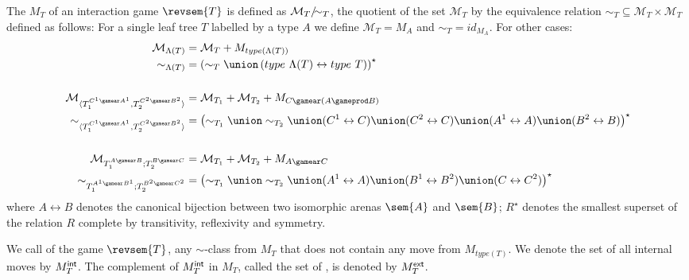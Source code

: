 \begin{definition}
The  $M_T$ of an interaction game
$\revsem{T}$ is defined as $\mathcal{M}_T/\hspace{-0.5em}\sim_T$,
the quotient of the set $\mathcal{M}_T$ by the equivalence relation
$\sim_T \subseteq \mathcal{M}_T \times \mathcal{M}_T$ defined as follows:
For a single leaf tree $T$ labelled by a type $A$ we define
$\mathcal{M}_T = M_A$ and $\sim_T = id_{M_A}$. For other cases:
    \begin{align*}
        \mathcal{M}_{\Lambda(T)} &= \mathcal{M}_{T} + M_{type(\Lambda(T))}
    \\
        \sim_{\Lambda(T)} &= \left( \sim_{T}
        \union \left(type\ \Lambda(T) \leftrightarrow type\ T\right)
        \right)^\star
    \\
    \\
        \mathcal{M}_{\langle T_1^{C^1 \gamear A^1}, T_2^{C^2 \gamear B^2}\rangle}
        &= \mathcal{M}_{T_1} + \mathcal{M}_{T_2} + M_{C \gamear (A \gameprod B)}
    \\
         \sim_{\langle T_1^{C^1 \gamear A^1}, T_2^{C^2 \gamear B^2}\rangle} &= \left( \sim_{T_1}
        \union \sim_{T_2} \union (C^1 \leftrightarrow C) \union (C^2 \leftrightarrow C)
        \union (A^1 \leftrightarrow A) \union (B^2 \leftrightarrow B)
        \right)^\star
    \\
    \\
        \mathcal{M}_{T_1^{A \gamear B};T_2^{B \gamear C}} &=
            \mathcal{M}_{T_1} + \mathcal{M}_{T_2} + M_{A\gamear C}
        \\
         \sim_{T_1^{A^1 \gamear B^1};T_2^{B^2 \gamear C^2}} &= \left( \sim_{T_1}
        \union \sim_{T_2} \union (A^1 \leftrightarrow A)
        \union (B^1 \leftrightarrow B^2) \union (C \leftrightarrow C^2)
        \right)^\star
    \end{align*}
    where $A\leftrightarrow B$ denotes the canonical bijection between two isomorphic arenas $\sem{A}$ and $\sem{B}$; $R^\star$ denotes the smallest superset of the relation $R$ complete by transitivity, reflexivity and symmetry.
\end{definition}

We call  of the game $\revsem{T}$, any $\sim$-class from $M_T$ that does not contain any move from $M_{type(T)}$. We denote the set of all internal moves by $M_T^{\sf int}$. The complement of $M_T^{\sf int}$ in $M_T$, called the set of , is denoted by
$M_T^{\sf ext}$.

